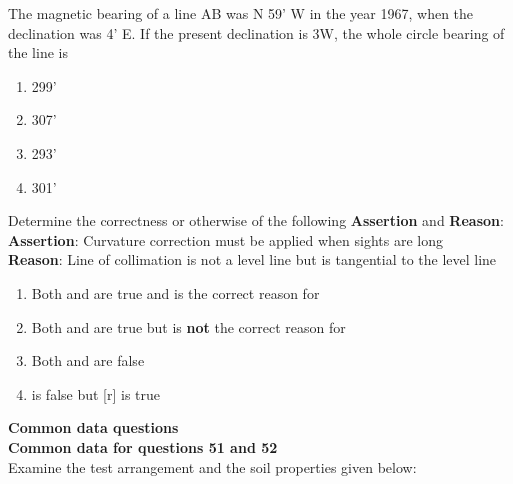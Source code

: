 
\iffalse
\title{2009-CE- 49-60}
\author{EE24BTECH11016 - DHWANITH M DODDAHUNDI}
\section{ce}
\chapter{2009}
\fi


\item The magnetic bearing of a line AB was N 59' W in the year 1967, when the declination was 4' E. If the present declination is 3\degree W, the whole circle bearing of the line is
\begin{enumerate}
    \item 299'
    \item 307'
    \item 293'
    \item 301'

\end{enumerate}
\item Determine the correctness or otherwise of the following \textbf{Assertion} and \textbf{Reason}: \\
\textbf{Assertion}: Curvature correction must be applied when sights are long \\
\textbf{Reason}: Line of collimation is not a level line but is tangential to the level line 
\begin{enumerate}
    \item Both  and  are true and  is the correct reason for 
    \item Both  and  are true but  is \textbf{not} the correct reason for 
    \item Both  and  are false
    \item {} is false but [r] is true \\
\end{enumerate} 
 \textbf{Common data questions} \\
 \textbf{Common data for questions 51 and 52} \\
 Examine the test arrangement and the soil properties given below:
